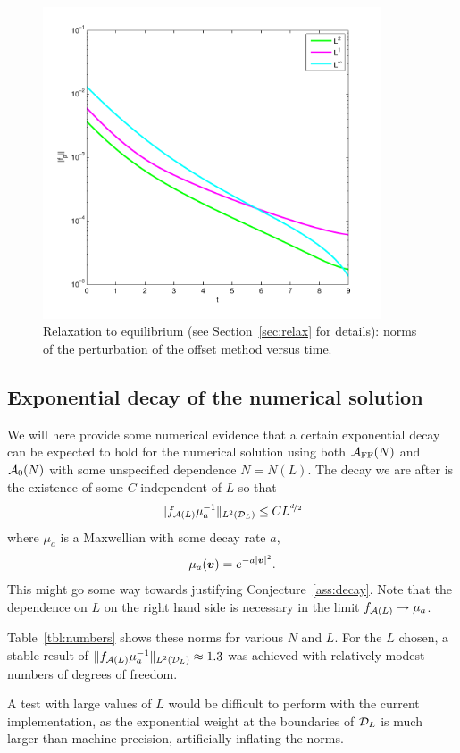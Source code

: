 \begin{figure}
    \centering
    \includegraphics[width=10cm]{figs/hcboltz/ds-pertnorms}
    \caption{Relaxation to equilibrium (see Section~\vref{sec:relax} for details):
      norms of the perturbation of the offset method versus time.} 
    \label{fig:relaxation}
\end{figure}

\subsection{Exponential decay of the numerical solution} \label{sec:decay}

We will here provide some numerical evidence that a certain exponential decay
can be expected to hold for the numerical solution using both $\mathcal{A}_\text{FF}(N)$ and
$\mathcal{A}_0(N)$ with some unspecified dependence $N=N(L)$. The decay we are after is
the existence of some $C$ independent of $L$ so that
\[
    \|f_{\mathcal{A}(L)} \mu_a^{-1}\|_{L^2(\mathcal{D}_L)} \leq C L^{\nicefrac{d}{2}}
\]
where $\mu_a$ is a Maxwellian with some decay rate $a$,
\[
    \mu_a({\bm v}) = e^{-a|{\bm v}|^2}.
\]
This might go some way towards justifying Conjecture~\ref{ass:decay}. Note that the dependence on $L$ on the
right hand side is necessary in the limit $f_{\mathcal{A}(L)} \to \mu_a$.

Table~\vref{tbl:numbers} shows these norms for various $N$ and $L$. For the $L$
chosen, a stable result of $\|f_{\mathcal{A}(L)} \mu_a^{-1}\|_{L^2(\mathcal{D}_L)}
\approx 1.3$ was achieved with relatively modest numbers of degrees of freedom.

A test with large values of $L$ would be difficult to perform with the current 
implementation, as the exponential weight at the boundaries of $\mathcal{D}_L$ is much
larger than machine precision, artificially inflating the norms.

